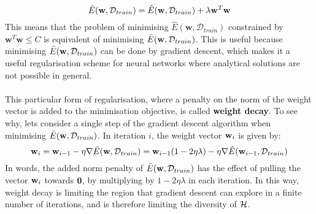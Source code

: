 $$
\bar{E}(\mathbf{w}, \mathcal{D}_{train}) = \hat{E}(\mathbf{w}, \mathcal{D}_{train}) + \lambda\mathbf{w}^T\mathbf{w}
$$
This means that the problem of minimising $\hat{E}(\mathbf{w}, \mathcal{D}_{train})$ constrained by $\mathbf{w}^T\mathbf{w} \leq C$ is equivalent of minimising $\bar{E}(\mathbf{w}, \mathcal{D}_{train})$. This is useful because minimising $\bar{E}(\mathbf{w}, \mathcal{D}_{train})$ can be done by gradient descent, which makes it a useful regularisation scheme for neural networks where analytical solutions are not possible in general.
\\\\
This particular form of regularisation, where a penalty on the norm of the weight vector is added to the minimisation objective, is called \textbf{weight decay}. To see why, lets consider a single step of the gradient descent algorithm when minimising $\bar{E}(\mathbf{w}, \mathcal{D}_{train})$. In iteration $i$, the weight vector $\mathbf{w}_i$ is given by:
$$
\mathbf{w}_i = \mathbf{w}_{i-1} - \eta \nabla \bar{E}(\mathbf{w}, \mathcal{D}_{train}) = \mathbf{w}_{i-1}(1 - 2\eta\lambda) - \eta \nabla \hat{E}(\mathbf{w}_{i-1}, \mathcal{D}_{train})	
$$
In words, the added norm penalty of $\bar{E}(\mathbf{w}, \mathcal{D}_{train})$ has the effect of pulling the vector $\mathbf{w}_i$ towards $\mathbf{0}$, by multiplying by $1 - 2\eta\lambda$ in each iteration. In this way, weight decay is limiting the region that gradient descent can explore in a finite number of iterations, and is therefore limiting the diversity of $\mathcal{H}$.